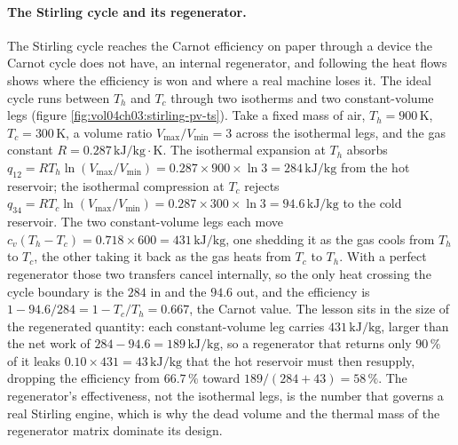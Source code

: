 \paragraph{The Stirling cycle and its regenerator.} The Stirling cycle reaches
the Carnot efficiency on paper through a device the Carnot cycle does not have,
an internal regenerator, and following the heat flows shows where the
efficiency is won and where a real machine loses it. The ideal cycle runs
between $T_h$ and $T_c$ through two isotherms and two constant-volume legs
(figure \ref{fig:vol04ch03:stirling-pv-ts}). Take a fixed mass of air,
$T_h = 900\,\si{\kelvin}$, $T_c = 300\,\si{\kelvin}$, a volume ratio
$V_{\max}/V_{\min} = 3$ across the isothermal legs, and the gas constant
$R = 0.287\,\text{kJ}/\text{kg}\cdot\text{K}$. The isothermal expansion at
$T_h$ absorbs $q_{12} = R T_h \ln(V_{\max}/V_{\min}) = 0.287 \times 900 \times
\ln 3 = 284\,\text{kJ}/\text{kg}$ from the hot reservoir; the isothermal
compression at $T_c$ rejects $q_{34} = R T_c \ln(V_{\max}/V_{\min}) = 0.287
\times 300 \times \ln 3 = 94.6\,\text{kJ}/\text{kg}$ to the cold reservoir.
The two constant-volume legs each move $c_v(T_h - T_c) = 0.718 \times 600 =
431\,\text{kJ}/\text{kg}$, one shedding it as the gas cools from $T_h$ to $T_c$,
the other taking it back as the gas heats from $T_c$ to $T_h$. With a perfect
regenerator those two transfers cancel internally, so the only heat crossing
the cycle boundary is the $284$ in and the $94.6$ out, and the efficiency is
$1 - 94.6/284 = 1 - T_c/T_h = 0.667$, the Carnot value. The lesson sits in the
size of the regenerated quantity: each constant-volume leg carries
$431\,\text{kJ}/\text{kg}$, larger than the net work of $284 - 94.6 = 189\,
\text{kJ}/\text{kg}$, so a regenerator that returns only $90\,\%$ of it leaks
$0.10 \times 431 = 43\,\text{kJ}/\text{kg}$ that the hot reservoir must then
resupply, dropping the efficiency from $66.7\,\%$ toward $189/(284 + 43) =
58\,\%$. The regenerator's effectiveness, not the isothermal legs, is the
number that governs a real Stirling engine, which is why the dead volume and
the thermal mass of the regenerator matrix dominate its design.



